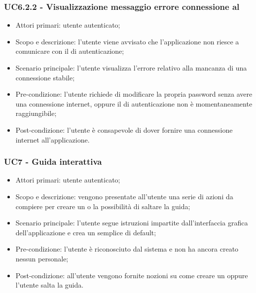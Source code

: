 \subsubsection{UC6.2.2 - Visualizzazione messaggio errore connessione al }
\begin{itemize}
	\item  Attori primari: utente autenticato;
	\item  Scopo e descrizione: l'utente viene avvisato che l'applicazione non riesce a comunicare con il  di autenticazione;
	\item  Scenario principale: l'utente visualizza l'errore relativo alla mancanza di una connessione stabile;
	\item  Pre-condizione: l'utente richiede di modificare la propria password senza avere una connessione internet, oppure il  di autenticazione non è momentaneamente raggiungibile;
	\item  Post-condizione: l'utente è consapevole di dover fornire una connessione internet all'applicazione.
\end{itemize}
\subsubsection{UC7 - Guida interattiva}
\begin{itemize}
	\item  Attori primari: utente autenticato;
	\item  Scopo e descrizione: vengono presentate all'utente una serie di azioni da compiere per creare un  o la possibilità di saltare la guida;
	\item  Scenario principale: l'utente segue istruzioni impartite dall'interfaccia grafica dell'applicazione e crea un semplice  di default;
	\item  Pre-condizione: l'utente è riconosciuto dal sistema e non ha ancora creato nessun  personale;
	\item  Post-condizione: all'utente vengono fornite nozioni su come creare un  oppure l'utente salta la guida.
\end{itemize}

